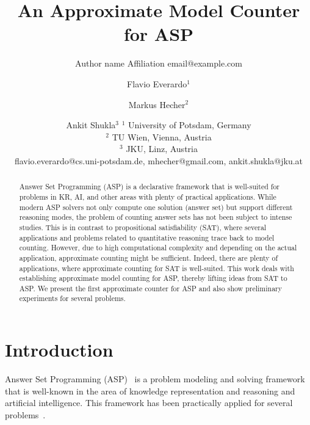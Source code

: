 \documentclass{article}
\title{An Approximate Model Counter for ASP}
\author{%
    Author name
    \affiliations
    Affiliation
    \emails
    email@example.com    %
}
\author{%
Flavio Everardo$^1$\and
Markus Hecher$^2$\and
Ankit Shukla$^{3}$
\affiliations
$^1$ University of Potsdam, Germany\\
$^2$ TU Wien, Vienna, Austria\\
$^3$ JKU, Linz, Austria\\
\emails
flavio.everardo@cs.uni-potsdam.de,
mhecher@gmail.com,
ankit.shukla@jku.at
}
\begin{document}
\maketitle

\begin{abstract}
Answer Set Programming (ASP) is a declarative framework that is well-suited for problems in KR, AI, and other areas with plenty of practical applications.
While modern ASP solvers not only compute one solution (answer set) but support different reasoning modes,  the problem of counting answer sets has not been subject to intense studies.
This is in contrast to propositional satisfiability (SAT), where several applications and problems related to quantitative reasoning trace back to model counting. However, due to high computational complexity and depending on the actual application, approximate counting might be sufficient. Indeed, there are plenty of applications, where approximate counting for SAT is well-suited. This work deals with establishing approximate model counting for ASP, thereby lifting ideas from SAT to ASP. We present the first approximate counter for ASP and also show preliminary experiments for several problems.
\end{abstract}

\section{Introduction} \label{sec:introduction}
%
Answer Set Programming (ASP)~\cite{Lifschitz99,BrewkaEiterTruszczynski11,GebserKaminskiKaufmannSchaub12} is a
problem modeling and solving framework that is well-known in the area
of knowledge representation and reasoning and artificial intelligence.
%
This framework has been practically applied for several
problems~\cite{BalducciniGelfondNogueira06a,NiemelaSimonsSoininen99,NogueiraBalducciniGelfond01a,GuziolowskiEtAl13a,SchaubWoltran18}.
%
\end{document}
